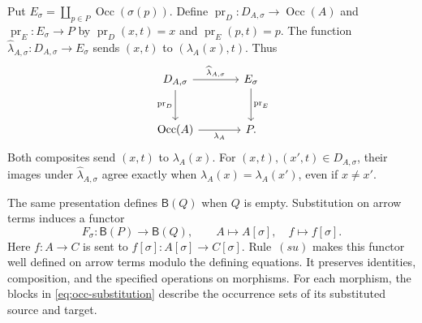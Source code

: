 \documentclass[11pt]{article}
\newcommand{\B}{\mathsf B}
\newcommand{\Occ}{\operatorname{Occ}}
\begin{document}
Put $E_\sigma=\coprod_{p\in P}\Occ(\sigma(p))$.
Define $\operatorname{pr}_D:D_{A,\sigma}\to\Occ(A)$ and
$\operatorname{pr}_E:E_\sigma\to P$ by
$\operatorname{pr}_D(x,t)=x$ and $\operatorname{pr}_E(p,t)=p$.
The function
$\widehat\lambda_{A,\sigma}:D_{A,\sigma}\to E_\sigma$ sends
$(x,t)$ to $(\lambda_A(x),t)$. Thus
\begin{equation}
\begin{tikzcd}[column sep=large,row sep=large]
 D_{A,\sigma}\arrow[r,"\widehat\lambda_{A,\sigma}"]
   \arrow[d,"\operatorname{pr}_D"']
   &E_\sigma\arrow[d,"\operatorname{pr}_E"]\\
 \Occ(A)\arrow[r,"\lambda_A"']&P.
\end{tikzcd}
\label{eq:block-square}
\end{equation}
Both composites send $(x,t)$ to $\lambda_A(x)$.
For $(x,t),(x',t)\in D_{A,\sigma}$, their images under
$\widehat\lambda_{A,\sigma}$ agree exactly when
$\lambda_A(x)=\lambda_A(x')$, even if $x\ne x'$.

The same presentation defines $\B(Q)$ when $Q$ is empty.
Substitution on arrow terms induces a functor
\[
 F_\sigma:\B(P)\longrightarrow\B(Q),\qquad
 A\longmapsto A[\sigma],\quad f\longmapsto f[\sigma].
\]
Here $f:A\to C$ is sent to
$f[\sigma]:A[\sigma]\to C[\sigma]$.
Rule~$(su)$ makes this functor well defined on arrow terms modulo the
defining equations. It preserves identities, composition, and the
specified operations on morphisms. For each morphism, the blocks in
\eqref{eq:occ-substitution} describe the occurrence sets of its
substituted source and target.
\end{document}
